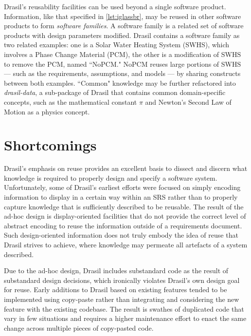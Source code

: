 Drasil's reusability facilities can be used beyond a single software product. Information, like that specified in \autoref{lst:iglassbr}, may be reused in other software products to form \textit{software families}. A software family is a related set of software products with design parameters modified. Drasil contains a software family as two related examples: one is a Solar Water Heating System (SWHS), which involves a Phase Change Material (PCM), the other is a modification of SWHS to remove the PCM, named ``NoPCM." NoPCM reuses large portions of SWHS --- such as the requirements, assumptions, and models --- by sharing constructs between both examples. ``Common" knowledge may be further refactored into \textit{drasil-data}, a sub-package of Drasil that contains common domain-specific concepts, such as the mathematical constant $\pi$ and Newton's Second Law of Motion as a physics concept.

\section{Shortcomings}\label{iprobdrasil}
Drasil's emphasis on reuse provides an excellent basis to dissect and discern what knowledge is required to properly design and specify a software system. Unfortunately, some of Drasil's earliest efforts were focused on simply encoding information to display in a certain way within an SRS rather than to properly capture knowledge that is sufficiently described to be reusable. The result of the ad-hoc design is display-oriented facilities that do not provide the correct level of abstract encoding to reuse the information outside of a requirements document. Such design-oriented information does not truly embody the idea of reuse that Drasil strives to achieve, where knowledge may permeate all artefacts of a system described.

Due to the ad-hoc design, Drasil includes substandard code as the result of substandard design decisions, which ironically violates Drasil's own design goal for reuse. Early additions to Drasil based on existing features tended to be implemented using copy-paste rather than integrating and considering the new feature with the existing codebase. The result is swathes of duplicated code that vary in few situations and requires a higher maintenance effort to enact the same change across multiple pieces of copy-pasted code.

